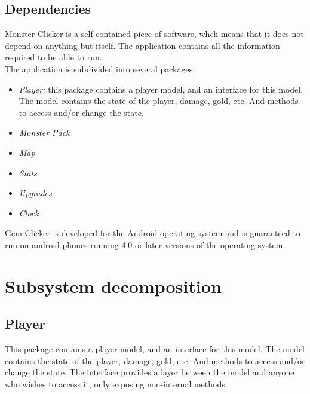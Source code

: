 \documentclass{article}
\begin{document}
\subsection{Dependencies}
Monster Clicker is a self contained piece of software, whch means that it does not
depend on anything but itself. The application contains all the information 
required to be able to run. \\

\noindent
The application is subdivided into several packages:
\begin{itemize}
    \item \emph{Player:} this package contains a player model, and an interface for this model. The model contains the state of the player, damage, gold, etc. And methods to access and/or change the state.
    \item \emph{Monster Pack}
    \item \emph{Map}
    \item \emph{Stats}
    \item \emph{Upgrades}
    \item \emph{Clock}
\end{itemize}

\noindent
Gem Clicker is developed for the Android operating system and is guaranteed to
run on android phones running 4.0 or later versions of the operating system.  

\section{Subsystem decomposition}

\subsection{Player}
This package contains a player model, and an interface for this model. The model contains the state of the player, damage, gold, etc. And methods to access and/or change the state. The interface provides a layer between the model and anyone who wishes to access it, only exposing non-internal methods.
\newpage
\end{document}
